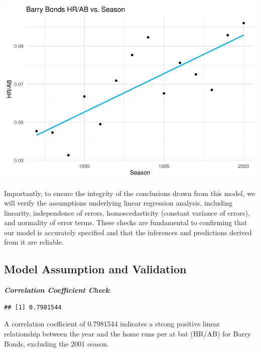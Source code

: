 \documentclass[
]{article}
\newenvironment{Shaded}{\begin{snugshade}}{\end{snugshade}}
\newcommand{\FunctionTok}[1]{\textcolor[rgb]{0.13,0.29,0.53}{\textbf{#1}}}
\newcommand{\NormalTok}[1]{#1}
\newcommand{\SpecialCharTok}[1]{\textcolor[rgb]{0.81,0.36,0.00}{\textbf{#1}}}
\begin{document}
\includegraphics{602_project_files/figure-latex/unnamed-chunk-4-1.pdf}

Importantly, to ensure the integrity of the conclusions drawn from this
model, we will verify the assumptions underlying linear regression
analysis, including linearity, independence of errors, homoscedasticity
(constant variance of errors), and normality of error terms. These
checks are fundamental to confirming that our model is accurately
specified and that the inferences and predictions derived from it are
reliable.

\hypertarget{model-assumption-and-validation}{%
\subsection{Model Assumption and
Validation}\label{model-assumption-and-validation}}

\textbf{\emph{Correlation Coefficient Check}}:

\begin{Shaded}
\end{Shaded}

\begin{verbatim}
## [1] 0.7981544
\end{verbatim}

A correlation coefficient of 0.7981544 indicates a strong positive
linear relationship between the year and the home runs per at bat
(HR/AB) for Barry Bonds, excluding the 2001 season.
\end{document}
